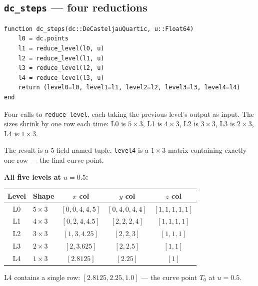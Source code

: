 \documentclass[12pt, a4paper]{article}
\newcommand{\cd}[1]{\texttt{#1}}
\begin{document}
\subsection{\texttt{dc\_steps} --- four reductions}

\begin{verbatim}
function dc_steps(dc::DeCasteljauQuartic, u::Float64)
    l0 = dc.points
    l1 = reduce_level(l0, u)
    l2 = reduce_level(l1, u)
    l3 = reduce_level(l2, u)
    l4 = reduce_level(l3, u)
    return (level0=l0, level1=l1, level2=l2, level3=l3, level4=l4)
end
\end{verbatim}

Four calls to \cd{reduce\_level}, each taking the previous
level's output as input.
The sizes shrink by one row each time:
L0 is $5\times3$, L1 is $4\times3$, L2 is $3\times3$,
L3 is $2\times3$, L4 is $1\times3$.

The result is a 5-field named tuple.
\cd{level4} is a $1\times3$ matrix containing exactly
one row --- the final curve point.

\begin{examplebox}
\textbf{All five levels at $u=0.5$:}

\medskip
\begin{tabular}{clccc}
\toprule
Level & Shape & $x$ col & $y$ col & $z$ col \\
\midrule
L0 & $5\times3$ & $[0,0,4,4,5]$ & $[0,4,0,4,4]$ & $[1,1,1,1,1]$ \\
L1 & $4\times3$ & $[0,2,4,4.5]$ & $[2,2,2,4]$ & $[1,1,1,1]$ \\
L2 & $3\times3$ & $[1,3,4.25]$ & $[2,2,3]$ & $[1,1,1]$ \\
L3 & $2\times3$ & $[2,3.625]$ & $[2,2.5]$ & $[1,1]$ \\
L4 & $1\times3$ & $[2.8125]$ & $[2.25]$ & $[1]$ \\
\bottomrule
\end{tabular}

\medskip
L4 contains a single row: $[2.8125, 2.25, 1.0]$
--- the curve point $T_0$ at $u=0.5$. \checkmark
\end{examplebox}
\end{document}
